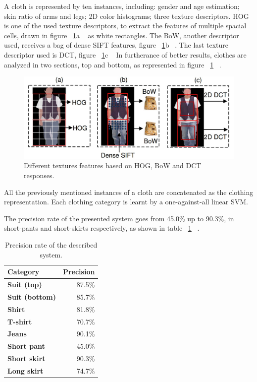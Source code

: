 \documentclass[titlepage,12pt,a4paper,times]{book}
\begin{document}
A cloth is represented by ten instances, including: gender and age estimation;
skin ratio of arms and legs; 2D color histograms; three texture descriptors.
\ac{HOG} is one of the used texture descriptors, to extract the features of
multiple spacial cells, drawn in figure ~\ref{fig:dtf}a ~\citep{1} as white
rectangles. The \ac{BoW}, another descriptor used, receives a bag of dense
\ac{SIFT} features, figure ~\ref{fig:dtf}b ~\citep{1}. The last texture
descriptor used is \ac{DCT}, figure ~\ref{fig:dtf}c ~\citep{1} In furtherance
of better results, clothes are analyzed in two sections, top and bottom, as
represented in figure ~\ref{fig:dtf} ~\citep{1}.

\begin{figure}[!h]
\centering
\includegraphics[scale=0.4]{images/top_bottom.jpg}
\caption{Different textures features based on \ac{HOG}, \ac{BoW} and
\acs{DCT} responses.}
\label{fig:dtf}
\end{figure}
\FloatBarrier

All the previously mentioned instances of a cloth are concatenated as the
clothing representation. Each clothing category is learnt by a
one-against-all linear \ac{SVM}.

The precision rate of the presented system goes from 45.0\% up to 90.3\%,
in short-pants and short-skirts respectively, as shown in table ~\ref{tab:prds}
 ~\citep{1}.

 \begin{table}[!h]
\centering
\begin{tabular}{|l|r|}
\hline
\textbf{Category} & \textbf{Precision}\\
\hline
\hline
\textbf{Suit (top)} & 87.5\% \\
\hline
\textbf{Suit (bottom)} & 85.7\% \\
\hline
\textbf{Shirt} & 81.8\% \\
\hline
\textbf{T-shirt} & 70.7\% \\
\hline
\textbf{Jeans} & 90.1\% \\
\hline
\textbf{Short pant} & 45.0\% \\
\hline
\textbf{Short skirt} & 90.3\% \\
\hline
\textbf{Long skirt} & 74.7\% \\
\hline
\end{tabular}
\caption{Precision rate of the described system.}
\label{tab:prds}
\end{table}
\FloatBarrier
\end{document}
